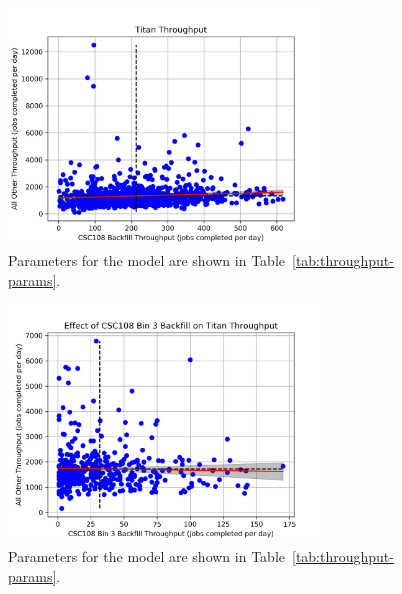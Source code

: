 \begin{figure}
  \includegraphics[width=0.75\textwidth]{images/linfit-throughput-all.png}
\caption{Parameters for the model are shown in
    Table~\ref{tab:throughput-params}.}
\label{fig:throughput-all}
\end{figure}

\begin{figure}
  \includegraphics[width=0.75\textwidth]{images/linfit-throughput-bin3.png}
\caption{Parameters for the model are shown in
    Table~\ref{tab:throughput-params}.}
\label{fig:throughput-bin3}
\end{figure}

